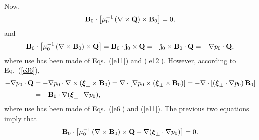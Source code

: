 \documentclass[12pt,prb,aps,notitlepage]{revtex4-1}
\newcommand{\bxi}{\mbox{\boldmath$\xi$}}
\begin{document}
Now,
\begin{equation}
{\bf B}_0 \cdot \left[\mu_0^{-1}\,(\nabla\times {\bf Q})\times{\bf B}_0\right] =0,
\end{equation}
and
\begin{align}
{\bf B}_0\cdot\left[\mu_0^{-1}\, (\nabla\times {\bf B}_0)\times {\bf Q}\right]= {\bf B}_0\cdot{\bf j}_0\times {\bf Q} =-{\bf j}_0\times {\bf B}_0\cdot {\bf Q}
=-\nabla p_0\cdot{\bf Q},
\end{align}
where use has been made of Eqs.~(\ref{e11}) and (\ref{e12}). However, according to Eq.~(\ref{e36}), 
\begin{align}
-\nabla p_0\cdot{\bf Q} &= -\nabla p_0\cdot\nabla\times(\bxi_\perp\times {\bf B}_0)=\nabla\cdot\left[\nabla p_0\times(\bxi_\perp\times {\bf B}_0)\right]
=-\nabla\cdot[(\bxi_\perp\cdot\nabla p_0)\, {\bf B}_0]\nonumber\\[0.5ex]
&= - {\bf B}_0\cdot\nabla (\bxi_\perp\cdot\nabla p_0),
\end{align}
where use has been made of Eqs.~(\ref{e6}) and (\ref{e11}). The previous two equations imply that
\begin{equation}
{\bf B}_0\cdot\left[\mu_0^{-1}\, (\nabla\times {\bf B}_0)\times {\bf Q}+\nabla(\bxi_\perp\cdot\nabla p_0)\right] =0.
\end{equation}
\end{document}
